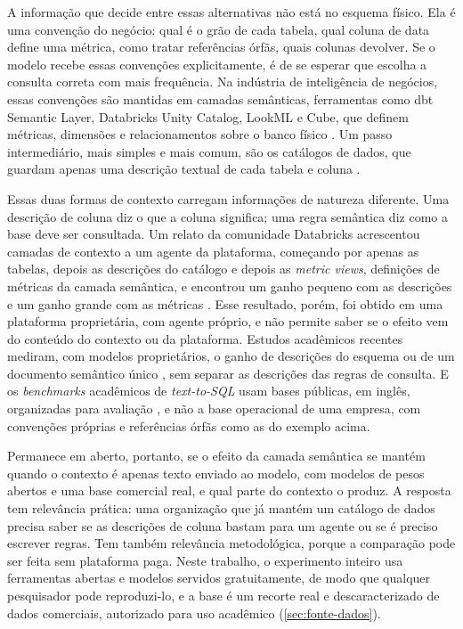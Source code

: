 A informação que decide entre essas alternativas não está no esquema
físico. Ela é uma convenção do negócio: qual é o grão de cada tabela, qual
coluna de data define uma métrica, como tratar referências órfãs, quais
colunas devolver. Se o modelo recebe essas convenções explicitamente, é de
se esperar que escolha a consulta correta com mais frequência. Na
indústria de inteligência de negócios, essas convenções são mantidas em
camadas semânticas, ferramentas como dbt Semantic Layer, Databricks Unity
Catalog, LookML e Cube, que definem métricas, dimensões e relacionamentos
sobre o banco físico
\cite{dbt_semanticlayer,databricks_metricviews,looker_lookml,cube_datamodel}.
Um passo intermediário, mais simples e mais comum, são os catálogos de
dados, que guardam apenas uma descrição textual de cada tabela e coluna
\cite{ehrlinger2021catalogs}.

Essas duas formas de contexto carregam informações de natureza diferente.
Uma descrição de coluna diz o que a coluna significa; uma regra semântica
diz como a base deve ser consultada. Um relato da comunidade Databricks
acrescentou camadas de contexto a um agente da plataforma, começando por
apenas as tabelas, depois as descrições do catálogo e depois as
\textit{metric views}, definições de métricas da camada semântica, e
encontrou um ganho pequeno com as descrições e um ganho grande com as
métricas \cite{databricks2026genie}. Esse resultado, porém, foi obtido em
uma plataforma proprietária, com agente próprio, e não permite saber se o
efeito vem do conteúdo do contexto ou da plataforma. Estudos acadêmicos
recentes mediram, com modelos proprietários, o ganho de descrições do
esquema \cite{bouattour2026prompting} ou de um documento semântico único
\cite{rumiantsau2026semantic}, sem separar as descrições das regras de
consulta. E os \textit{benchmarks} acadêmicos de \textit{text-to-SQL} usam
bases públicas, em inglês, organizadas para avaliação
\cite{yu2018spider,li2023bird}, e não a base operacional de uma empresa,
com convenções próprias e referências órfãs como as do exemplo acima.

Permanece em aberto, portanto, se o efeito da camada semântica se mantém
quando o contexto é apenas texto enviado ao modelo, com modelos de pesos
abertos e uma base comercial real, e qual parte do contexto o produz. A
resposta tem relevância prática: uma organização que já mantém um catálogo
de dados precisa saber se as descrições de coluna bastam para um agente
ou se é preciso escrever regras. Tem também relevância metodológica, porque
a comparação pode ser feita sem plataforma paga. Neste trabalho, o
experimento inteiro usa ferramentas abertas e modelos servidos
gratuitamente, de modo que qualquer pesquisador pode reproduzi-lo, e a
base é um recorte real e descaracterizado de dados comerciais, autorizado
para uso acadêmico (\autoref{sec:fonte-dados}).

